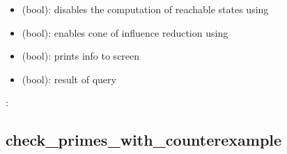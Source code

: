 \documentclass[letterpaper,10pt,english]{sphinxmanual}
\begin{document}
\begin{fulllineitems}
\begin{description}
\begin{itemize}
\item {} 
 (bool): disables the computation of reachable states using 

\item {} 
 (bool): enables cone of influence reduction using 

\item {} 
 (bool): prints info to screen

\end{itemize}

\item[{\sphinxstylestrong{returns}:}] \leavevmode\begin{itemize}
\item {} 
 (bool): result of query

\end{itemize}

\end{description}

:

\begin{sphinxVerbatim}[commandchars=\\\{\}]
  
  
  
   
\end{sphinxVerbatim}

\end{fulllineitems}



\subsection{check\_primes\_with\_counterexample}
\label{\detokenize{ModelChecking:check-primes-with-counterexample}}\label{\detokenize{ModelChecking:id3}}
\end{document}
